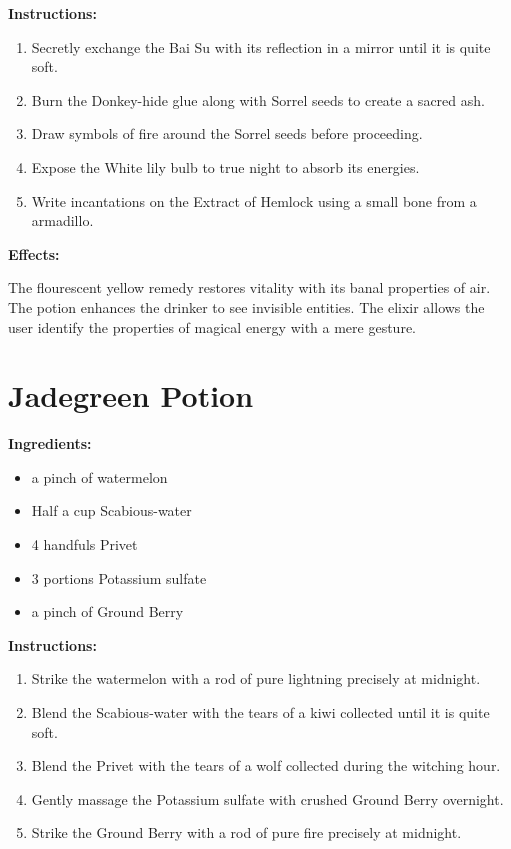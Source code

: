 \documentclass{article}
\begin{document}
\textbf{Instructions:}

\begin{enumerate}
  \item Secretly exchange the Bai Su with its reflection in a mirror until it is quite soft.
  \item Burn the Donkey-hide glue along with Sorrel seeds to create a sacred ash.
  \item Draw symbols of fire around the Sorrel seeds before proceeding.
  \item Expose the White lily bulb to true night to absorb its energies.
  \item Write incantations on the Extract of Hemlock using a small bone from a armadillo.
\end{enumerate}

\textbf{Effects:}

The flourescent yellow remedy restores vitality with its banal properties of air. The potion enhances the drinker to see invisible entities. The elixir allows the user identify the properties of magical energy with a mere gesture.

\newpage
\section*{Jadegreen Potion}

\textbf{Ingredients:}

\begin{itemize}
  \item a pinch of watermelon
  \item Half a cup Scabious-water
  \item 4 handfuls Privet
  \item 3 portions Potassium sulfate
  \item a pinch of Ground Berry
\end{itemize}

\textbf{Instructions:}

\begin{enumerate}
  \item Strike the watermelon with a rod of pure lightning precisely at midnight.
  \item Blend the Scabious-water with the tears of a kiwi collected until it is quite soft.
  \item Blend the Privet with the tears of a wolf collected during the witching hour.
  \item Gently massage the Potassium sulfate with crushed Ground Berry overnight.
  \item Strike the Ground Berry with a rod of pure fire precisely at midnight.
\end{enumerate}
\end{document}
